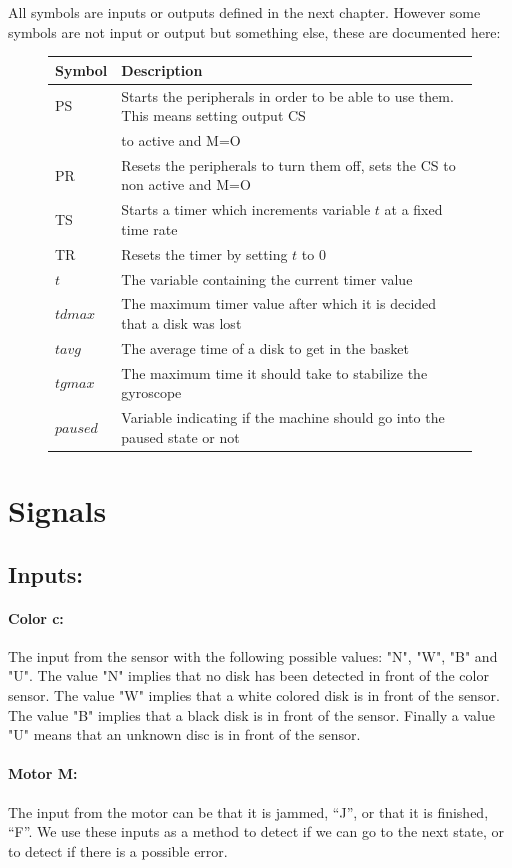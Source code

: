 \documentclass[a4paper,oneside,11pt]{article}
\begin{document}
All symbols are inputs or outputs defined in the next chapter. However some symbols are not input or output but something else, these are documented here:

\begin{figure}[H]
\begin{tabular}{|l|l|}
\hline
\textbf{Symbol} & \textbf{Description} \\
\hline
PS & Starts the peripherals in order to be able to use them. This means setting output CS \\
 &  to active and M=O \\
PR & Resets the peripherals to turn them off, sets the CS to non active and M=O \\
TS & Starts a timer which increments variable $t$ at a fixed time rate \\
TR & Resets the timer by setting $t$ to 0\\
$t$ & The variable containing the current timer value \\
$tdmax$ & The maximum timer value after which it is decided that a disk was lost \\
$tavg$ & The average time of a disk to get in the basket \\
$tgmax$ & The maximum time it should take to stabilize the gyroscope \\
$paused$ & Variable indicating if the machine should go into the paused state or not \\
\hline
\end{tabular}
\end{figure}

\section{Signals}
\subsection{Inputs:}
\paragraph{Color c:} The input from the sensor with the following possible values: "N", "W", "B" and "U". The value "N" implies that no disk has been detected in front of the color sensor. The value "W" implies that a white colored disk is in front of the sensor. The value "B" implies that a black disk is in front of the sensor. Finally a value "U" means that an unknown disc is in front of the sensor.
\paragraph{Motor M:} The input from the motor can be that it is jammed, “J”, or that it is finished, “F”. We use these inputs as a method to detect if we can go to the next state, or to detect if there is a possible error.
\end{document}
